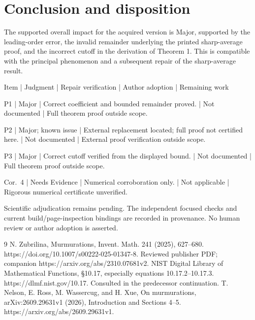 \documentclass[10pt]{article}
\begin{document}
\section*{Conclusion and disposition}
The supported overall impact for the acquired version is Major, supported by the leading-order error, the invalid remainder underlying the printed sharp-average proof, and the incorrect cutoff in the derivation of Theorem 1. This is compatible with the principal phenomenon and a subsequent repair of the sharp-average result.\par
Item | Judgment | Repair verification | Author adoption | Remaining work\par
P1 | Major | Correct coefficient and bounded remainder proved. | Not documented | Full theorem proof outside scope.\par
P2 | Major; known issue | External replacement located; full proof not certified here. | Not documented | External proof verification outside scope.\par
P3 | Major | Correct cutoff verified from the displayed bound. | Not documented | Full theorem proof outside scope.\par
Cor. 4 | Needs Evidence | Numerical corroboration only. | Not applicable | Rigorous numerical certificate unverified.\par
Scientific adjudication remains pending. The independent focused checks and current build/page-inspection bindings are recorded in provenance. No human review or author adoption is asserted.\par
9 N. Zubrilina, Murmurations, Invent. Math. 241 (2025), 627–680. https://doi.org/10.1007/s00222-025-01347-8. Reviewed publisher PDF; companion https://arxiv.org/abs/2310.07681v2. NIST Digital Library of Mathematical Functions, §10.17, especially equations 10.17.2–10.17.3. https://dlmf.nist.gov/10.17. Consulted in the predecessor continuation. T. Nelson, E. Ross, M. Wassercug, and H. Xue, On murmurations, arXiv:2609.29631v1 (2026), Introduction and Sections 4–5. https://arxiv.org/abs/2609.29631v1.\par
\end{document}
